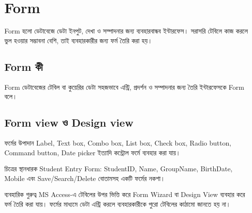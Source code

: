 \section{Form}
Form হলো ডেটাবেজে ডেটা ইনপুট, দেখা ও সম্পাদনার জন্য ব্যবহারবান্ধব ইন্টারফেস। সরাসরি টেবিলে কাজ করলে ভুল হওয়ার সম্ভাবনা বেশি, তাই ব্যবহারকারীর জন্য ফর্ম তৈরি করা হয়।

\subsection{Form কী}
\begin{definitionbox}{Form}
ডেটাবেজের টেবিল বা কুয়েরির ডেটা সহজভাবে এন্ট্রি, প্রদর্শন ও সম্পাদনার জন্য তৈরি ইন্টারফেসকে Form বলে।
\end{definitionbox}

\subsection{Form view ও Design view}
\begin{keypointbox}{ফর্মের উপাদান}
Label, Text box, Combo box, List box, Check box, Radio button, Command button, Date picker ইত্যাদি কন্ট্রোল ফর্মে ব্যবহার করা যায়।
\end{keypointbox}

\begin{examplebox}{চিত্রের স্থানধারক}
Student Entry Form: StudentID, Name, GroupName, BirthDate, Mobile এবং Save/Search/Delete বোতামসহ একটি ফর্মের নকশা।
\end{examplebox}

\begin{boardbox}{ব্যবহারিক গুরুত্ব}
MS Access-এ টেবিলের উপর ভিত্তি করে Form Wizard বা Design View ব্যবহার করে ফর্ম তৈরি করা যায়। ফর্মের মাধ্যমে ডেটা এন্ট্রি করলে ব্যবহারকারীকে পুরো টেবিলের কাঠামো জানতে হয় না।
\end{boardbox}
